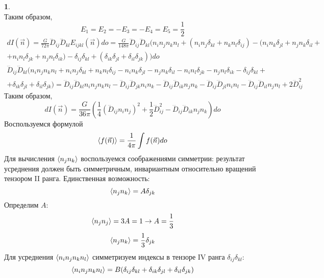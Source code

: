 \documentclass[12pt]{article}
\theoremstyle{definition}
\newtheorem{zad}{}[section]
\begin{document}
\begin{zad}
\begin{equation}
\end{equation}
Таким образом,
\begin{equation}
    \boxed{E_1=E_2=-E_3=-E_4=E_5=\frac{1}{2}}
\end{equation}
\begin{multline}
    dI(\vec{n})=\frac{G}{72\pi}\dddot{D}_{ij}\dddot{D}_{kl}E_{ijkl}(\vec{n})do=\frac{G}{148\pi}\dddot{D}_{ij}\dddot{D}_{kl}(n_in_jn_kn_l+(n_in_j\delta_{kl}+n_kn_l\delta_{ij})-(n_in_k\delta_{jl}+n_jn_k\delta_{il}+\\+n_in_l\delta_{jk}+n_jn_l\delta_{ik})-\delta_{ij}\delta_{kl}+(\delta_{ik}\delta_{jl}+\delta_{il}\delta_{jk}))do
\end{multline}
\begin{multline*}
    \dddot{D}_{ij}\dddot{D}_{kl}(n_in_jn_kn_l+n_in_j\delta_{kl}+n_kn_l\delta_{ij}-n_in_k\delta_{jl}-n_jn_k\delta_{il}-n_in_l\delta_{jk}-n_jn_l\delta_{ik}-\delta_{ij}\delta_{kl}+\\+\delta_{ik}\delta_{jl}+\delta_{il}\delta_{jk})=\dddot{D}_{ij}\dddot{D}_{kl}n_in_jn_kn_l-\dddot{D}_{ij}\dddot{D}_{jk}n_in_k-\dddot{D}_{ij}\dddot{D}_{ik}n_jn_k-\dddot{D}_{ij}\dddot{D}_{jl}n_in_l-\dddot{D}_{ij}\dddot{D}_{il}n_jn_l+2\dddot{D}_{ij}^2
\end{multline*}
Таким образом,
\begin{equation}
    \boxed{dI(\vec{n})=\frac{G}{36\pi}\left(\frac{1}{4}(\dddot{D}_{ij}n_in_j)^2+\frac{1}{2}\dddot{D}_{ij}^2-\dddot{D}_{ij}\dddot{D}_{ik}n_jn_k\right)do}
\end{equation}
Воспользуемся формулой
\begin{equation}
    \braket{f(\vec{n})}=\frac{1}{4\pi}\int f(\vec{n})do
\end{equation}
Для вычисления $\braket{n_jn_k}$ воспользуемся соображениями симметрии: результат усреднения должен быть симметричным, инвариантным относительно вращений тензором II ранга. Единственная возможность:
\begin{equation}
    \braket{n_jn_k}=A\delta_{jk}
\end{equation}
Определим $A$:
\begin{equation}
    \braket{n_jn_j}=3A=1\rightarrow A=\frac{1}{3}
\end{equation}
\begin{equation}
    \braket{n_jn_k}=\frac{1}{3}\delta_{jk}
\end{equation}
Для усреднения $\braket{n_in_jn_kn_l}$ симметризуем индексы в тензоре IV ранга $\delta_{ij}\delta_{kl}$:
\begin{equation}
    \braket{n_in_jn_kn_l}=B(\delta_{ij}\delta_{kl}+\delta_{ik}\delta_{jl}+\delta_{il}\delta_{jk})

\end{equation}
\end{zad}
\end{document}
